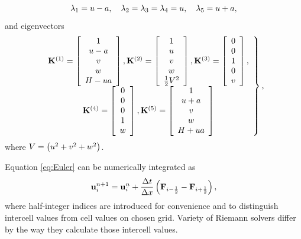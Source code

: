 \begin{align}
\lambda_1 = u - a, \quad \lambda_2 = \lambda_3 = \lambda_4 = u, \quad \lambda_5 = u + a,
\end{align}
and eigenvectors
\begin{align}
\left.\begin{array}{c}
\mathbf K^{(1)} = \left[\begin{array}{c}
1 \\ u - a \\ v \\ w \\ H - ua
\end{array}\right], \mathbf K^{(2)} = \left[\begin{array}{c}
1 \\ u  \\ v \\ w \\ \frac 12 V^2
\end{array}\right], \mathbf K^{(3)} = \left[\begin{array}{c}
0 \\ 0 \\ 1 \\ 0 \\ v
\end{array}\right], \\
\mathbf K^{(4)} = \left[\begin{array}{c}
0 \\ 0 \\ 0 \\ 1 \\ w
\end{array}\right], \mathbf K^{(5)} = \left[\begin{array}{c}
1 \\ u + a \\ v \\ w \\ H + ua
\end{array}\right]
\end{array}\right\}, \label{eq:eigenvecs}
\end{align}
where $V = \left(u^2+v^2+w^2\right)$.

Equation \eqref{eq:Euler} can be numerically integrated as
\begin{align}
\mathbf u_i^{n+1} = \mathbf u_i^n + \frac {\Delta t}{\Delta x} \left(\mathbf F_{i - \frac 12} - \mathbf F_{i + \frac 12}\right),
\end{align}
where half-integer indices are introduced for convenience and to distinguish intercell values from cell values on chosen grid. Variety of Riemann solvers differ by the way they calculate those intercell values.

